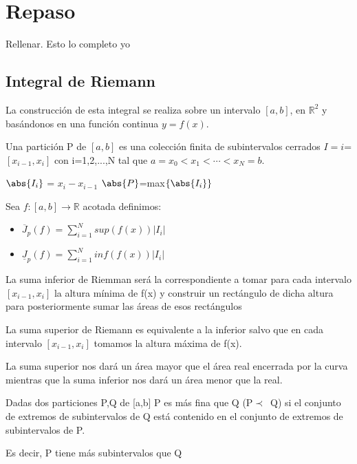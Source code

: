 \documentclass{apuntes}
\begin{document}
\chapter{Repaso}
\begin{theorem}
Rellenar. Esto lo completo yo
\end{theorem}

\section{Integral de Riemann}
La construcción de esta integral se realiza sobre un intervalo $[a,b]$, en $\mathbb{R}^2$ y basándonos en una función continua $y=f(x)$.
\begin{defn}[Partición]
Una partición P de $[a,b]$ es una colección finita de subintervalos cerrados $I=i$=$[x_{i-1}, x_i]$ con i=1,2,...,N tal que $a=x_0<x_1<\cdots < x_N=b$.

$\abs{I_i}$ = $x_i-x_{i-1}$
$\abs{P}$=max$\lbrace \abs{I_i} \rbrace$
\end{defn}

Sea $f:[ a,b ] \rightarrow \mathbb{R}$ acotada definimos:
\begin{itemize}
\item \begin{defn}
$\overline{J}_p(f)=\sum_{i=1}^{N}sup(f(x))|I_i|$
\end{defn}

\item \begin{defn}
$\underline{J}_p(f)=\sum_{i=1}^{N}inf(f(x))|I_i|$
\end{defn}
\end{itemize}

La suma inferior de Riemman será la correspondiente a tomar para cada intervalo $[x_{i-1}, x_i]$ la altura mínima de f(x) y construir un rectángulo de dicha altura para posteriormente sumar las áreas de esos rectángulos

La suma superior de Riemann es equivalente a la inferior salvo que en cada intervalo $[x_{i-1}, x_i]$ tomamos la altura máxima de f(x).

La suma superior nos dará un área mayor que el área real encerrada por la curva mientras que la suma inferior nos dará un área menor que la real.

\newpage
\begin{defn}[Finura]
Dadas dos particiones P,Q de [a,b] P es más fina que Q (P$\prec$~Q) si el conjunto de extremos de subintervalos de Q está contenido en el conjunto de extremos de subintervalos de P.

Es decir, P tiene más subintervalos que Q
\end{defn}
\end{document}
